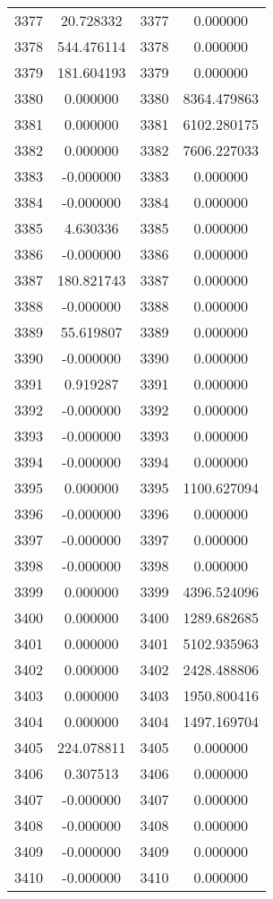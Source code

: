 \documentclass[12pt]{article}
\begin{document}
\begin{longtable}{@{}cccc@{}}
3377 & 20.728332 & 3377 & 0.000000 \\
3378 & 544.476114 & 3378 & 0.000000 \\
3379 & 181.604193 & 3379 & 0.000000 \\
3380 & 0.000000 & 3380 & 8364.479863 \\
3381 & 0.000000 & 3381 & 6102.280175 \\
3382 & 0.000000 & 3382 & 7606.227033 \\
3383 & -0.000000 & 3383 & 0.000000 \\
3384 & -0.000000 & 3384 & 0.000000 \\
3385 & 4.630336 & 3385 & 0.000000 \\
3386 & -0.000000 & 3386 & 0.000000 \\
3387 & 180.821743 & 3387 & 0.000000 \\
3388 & -0.000000 & 3388 & 0.000000 \\
3389 & 55.619807 & 3389 & 0.000000 \\
3390 & -0.000000 & 3390 & 0.000000 \\
3391 & 0.919287 & 3391 & 0.000000 \\
3392 & -0.000000 & 3392 & 0.000000 \\
3393 & -0.000000 & 3393 & 0.000000 \\
3394 & -0.000000 & 3394 & 0.000000 \\
3395 & 0.000000 & 3395 & 1100.627094 \\
3396 & -0.000000 & 3396 & 0.000000 \\
3397 & -0.000000 & 3397 & 0.000000 \\
3398 & -0.000000 & 3398 & 0.000000 \\
3399 & 0.000000 & 3399 & 4396.524096 \\
3400 & 0.000000 & 3400 & 1289.682685 \\
3401 & 0.000000 & 3401 & 5102.935963 \\
3402 & 0.000000 & 3402 & 2428.488806 \\
3403 & 0.000000 & 3403 & 1950.800416 \\
3404 & 0.000000 & 3404 & 1497.169704 \\
3405 & 224.078811 & 3405 & 0.000000 \\
3406 & 0.307513 & 3406 & 0.000000 \\
3407 & -0.000000 & 3407 & 0.000000 \\
3408 & -0.000000 & 3408 & 0.000000 \\
3409 & -0.000000 & 3409 & 0.000000 \\
3410 & -0.000000 & 3410 & 0.000000 \\

\end{longtable}
\end{document}

